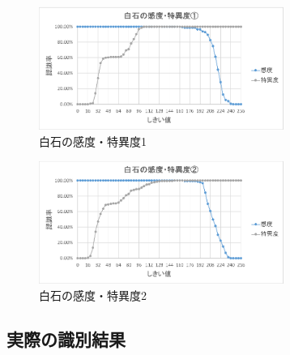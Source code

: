 \documentclass[openright]{nitocs}
\numberwithin{equation}{section}
\begin{document}
            \begin{figure}[tb] %
                \begin{center}
                \includegraphics[clip,width=80mm]{Case1_White_TPF_TNF.eps} 
                \caption{白石の感度・特異度1}
                \label{Case1White}
                \end{center}
            \end{figure}
            
            \begin{figure}[tb] %
                \begin{center}
                \includegraphics[clip,width=80mm]{Case2_White_TPF_TNF.eps} 
                \caption{白石の感度・特異度2}
                \label{Case2White}
                \end{center}
            \end{figure}

        \subsection{実際の識別結果} %
\end{document}

